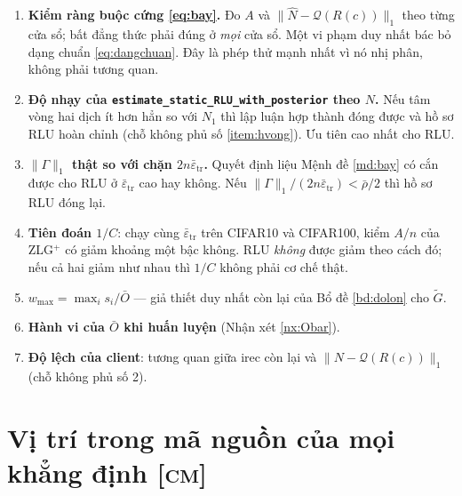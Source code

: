 \documentclass[11pt,a4paper]{article}
\theoremstyle{remark}
\newcommand{\quant}{\mathcal{Q}}
\newcommand{\epstr}{\bar\varepsilon_{\mathrm{tr}}}
\newcommand{\code}[1]{\texttt{\small #1}}
\begin{document}
\begin{enumerate}
\item \textbf{Kiểm ràng buộc cứng \eqref{eq:bay}.} Đo $A$ và
  $\|\hat N-\quant(R(c))\|_1$ theo từng cửa sổ; bất đẳng thức phải đúng ở
  \emph{mọi} cửa sổ. Một vi phạm duy nhất bác bỏ dạng chuẩn
  \eqref{eq:dangchuan}. Đây là phép thử mạnh nhất vì nó nhị phân, không phải
  tương quan.
\item \textbf{Độ nhạy của \code{estimate\_static\_RLU\_with\_posterior}
  theo $N$.} Nếu tâm vòng hai dịch ít hơn hẳn so với $N_1$ thì lập luận hợp
  thành đóng được và hồ sơ RLU hoàn chỉnh (chỗ không phủ số
  \ref{item:hvong}). Ưu tiên cao nhất cho RLU.

\item \textbf{$\|\Gamma\|_1$ thật so với chặn $2n\epstr$.} Quyết định liệu
  Mệnh đề \ref{md:bay} có cắn được cho RLU ở $\epstr$ cao hay không. Nếu
  $\|\Gamma\|_1/(2n\epstr)<\bar\rho/2$ thì hồ sơ RLU đóng lại.
\item \textbf{Tiên đoán $1/C$}: chạy cùng $\epstr$ trên CIFAR10 và CIFAR100,
  kiểm $A/n$ của ZLG$^+$ có giảm khoảng một bậc không. RLU \emph{không} được
  giảm theo cách đó; nếu cả hai giảm như nhau thì $1/C$ không phải cơ chế
  thật.
\item \textbf{$w_{\max}=\max_i s_i/\bar O$} --- giả thiết duy nhất còn lại
  của Bổ đề \ref{bd:dolon} cho $\tilde G$.
\item \textbf{Hành vi của $\bar O$ khi huấn luyện} (Nhận xét \ref{nx:Obar}).
\item \textbf{Độ lệch của client}: tương quan giữa irec còn lại và
  $\|N-\quant(R(c))\|_1$ (chỗ không phủ số 2).
\end{enumerate}

\appendix
\section{Vị trí trong mã nguồn của mọi khẳng định \textsc{[cm]}}
\label{sec:phuluc}
\end{document}
